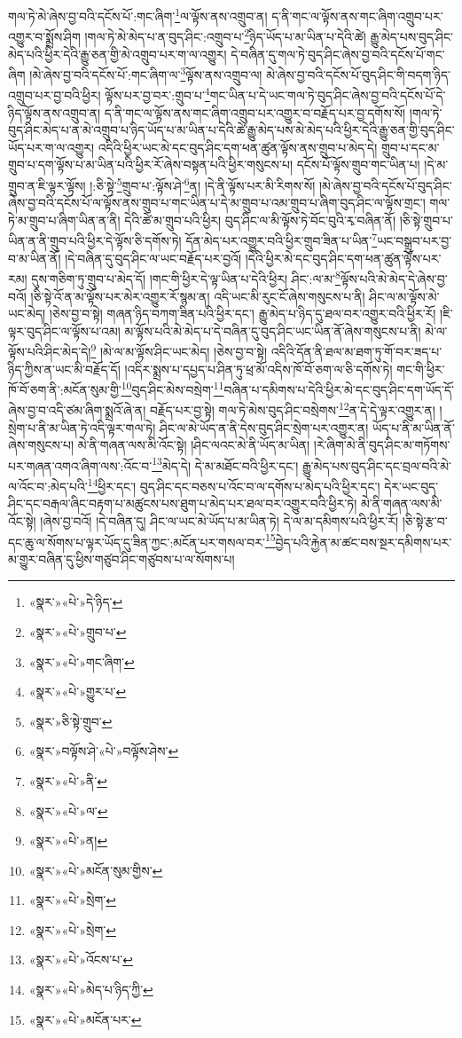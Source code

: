 གལ་ཏེ་མེ་ཞེས་བྱ་བའི་དངོས་པོ་:གང་ཞིག་\footnote{«སྣར་»«པེ་»དེ་ཉིད་}ལ་ལྟོས་ནས་འགྲུབ་ན། ད་ནི་གང་ལ་ལྟོས་ནས་གང་ཞིག་འགྲུབ་པར་འགྱུར་བ་སྨྲོས་ཤིག །གལ་ཏེ་མེ་མེད་པ་ན་བུད་ཤིང་:འགྲུབ་པ་\footnote{«སྣར་»«པེ་»གྲུབ་པ་}ཉིད་ཡོད་པ་མ་ཡིན་པ་དེའི་ཚེ། རྒྱུ་མེད་པས་བུད་ཤིང་མེད་པའི་ཕྱིར་དེའི་རྒྱུ་ཅན་གྱི་མེ་འགྲུབ་པར་ག་ལ་འགྱུར། དེ་བཞིན་དུ་གལ་ཏེ་བུད་ཤིང་ཞེས་བྱ་བའི་དངོས་པོ་གང་ཞིག །མེ་ཞེས་བྱ་བའི་དངོས་པོ་:གང་ཞིག་ལ་\footnote{«སྣར་»«པེ་»གང་ཞིག་}ལྟོས་ནས་འགྲུབ་ལ། མེ་ཞེས་བྱ་བའི་དངོས་པོ་བུད་ཤིང་གི་བདག་ཉིད་འགྲུབ་པར་བྱ་བའི་ཕྱིར། ལྟོས་པར་བྱ་བར་:གྲུབ་པ་\footnote{«སྣར་»«པེ་»གྱུར་པ་}གང་ཡིན་པ་དེ་ཡང་གལ་ཏེ་བུད་ཤིང་ཞེས་བྱ་བའི་དངོས་པོ་དེ་ཉིད་ལྟོས་ནས་འགྲུབ་ན། ད་ནི་གང་ལ་ལྟོས་ནས་གང་ཞིག་འགྲུབ་པར་འགྱུར་བ་བརྗོད་པར་བྱ་དགོས་སོ། །གལ་ཏེ་བུད་ཤིང་མེད་པ་ན་མེ་འགྲུབ་པ་ཉིད་ཡོད་པ་མ་ཡིན་པ་དེའི་ཚེ་རྒྱུ་མེད་པས་མེ་མེད་པའི་ཕྱིར་དེའི་རྒྱུ་ཅན་གྱི་བུད་ཤིང་ཡོད་པར་ག་ལ་འགྱུར། འདིའི་ཕྱིར་ཡང་མེ་དང་བུད་ཤིང་དག་ཕན་ཚུན་ལྟོས་ནས་གྲུབ་པ་མེད་དེ། གྲུབ་པ་དང་མ་གྲུབ་པ་དག་ལྟོས་པ་མ་ཡིན་པའི་ཕྱིར་རོ་ཞེས་བསྟན་པའི་ཕྱིར་གསུངས་པ། དངོས་པོ་ལྟོས་གྲུབ་གང་ཡིན་པ། །དེ་མ་གྲུབ་ན་ཇི་ལྟར་ལྟོས། །:ཅི་སྟེ་\footnote{«སྣར་»ཅི་སྟེ་གྲུབ་}གྲུབ་པ་:ལྟོས་ཤེ་\footnote{«སྣར་»བལྟོས་ཤེ་«པེ་»བལྟོས་ཤེས་}ན། །དེ་ནི་ལྟོས་པར་མི་རིགས་སོ། །མེ་ཞེས་བྱ་བའི་དངོས་པོ་བུད་ཤིང་ཞེས་བྱ་བའི་དངོས་པོ་ལ་ལྟོས་ནས་གྲུབ་པ་གང་ཡིན་པ་དེ་མ་གྲུབ་པ་འམ་གྲུབ་པ་ཞིག་བུད་ཤིང་ལ་ལྟོས་གྲང་། གལ་ཏེ་མ་གྲུབ་པ་ཞིག་ཡིན་ན་ནི། དེའི་ཚེ་མ་གྲུབ་པའི་ཕྱིར། བུད་ཤིང་ལ་མི་ལྟོས་ཏེ་བོང་བུའི་རྭ་བཞིན་ནོ། །ཅི་སྟེ་གྲུབ་པ་ཡིན་ན་ནི་གྲུབ་པའི་ཕྱིར་དེ་ལྟོས་ཅི་དགོས་ཏེ། དོན་མེད་པར་འགྱུར་བའི་ཕྱིར་གྲུབ་ཟིན་པ་ཡིན་\footnote{«སྣར་»«པེ་»ནི་}ཡང་བསྒྲུབ་པར་བྱ་བ་མ་ཡིན་ནོ། །དེ་བཞིན་དུ་བུད་ཤིང་ལ་ཡང་བརྗོད་པར་བྱའོ། །དེའི་ཕྱིར་མེ་དང་བུད་ཤིང་དག་ཕན་ཚུན་ལྟོས་པར་རམ། དུས་གཅིག་ཏུ་གྲུབ་པ་མེད་དོ། །གང་གི་ཕྱིར་དེ་ལྟ་ཡིན་པ་དེའི་ཕྱིར། ཤིང་:ལ་མ་\footnote{«སྣར་»«པེ་»ལ་}ལྟོས་པའི་མེ་མེད་དེ་ཞེས་བྱ་བའོ། །ཅི་སྟེ་འོ་ན་མ་ལྟོས་པར་མེར་འགྱུར་རོ་སྙམ་ན། འདི་ཡང་མི་རུང་ངོ་ཞེས་གསུངས་པ་ནི། ཤིང་ལ་མ་ལྟོས་མེ་ཡང་མེད། །ཅེས་བྱ་བ་སྟེ། གཞན་ཉིད་བཀག་ཟིན་པའི་ཕྱིར་དང་། རྒྱུ་མེད་པ་ཉིད་དུ་ཐལ་བར་འགྱུར་བའི་ཕྱིར་རོ། །ཇི་ལྟར་བུད་ཤིང་ལ་ལྟོས་པ་འམ། མ་ལྟོས་པའི་མེ་མེད་པ་དེ་བཞིན་དུ་བུད་ཤིང་ཡང་ཡིན་ནོ་ཞེས་གསུངས་པ་ནི། མེ་ལ་ལྟོས་པའི་ཤིང་མེད་དེ།\footnote{«སྣར་»«པེ་»ན།} །མེ་ལ་མ་ལྟོས་ཤིང་ཡང་མེད། །ཅེས་བྱ་བ་སྟེ། འདིའི་དོན་ནི་ཐལ་མ་ཐག་ཏུ་གོ་བར་ཟད་པ་ཉིད་ཀྱིས་ན་ཡང་མི་བརྗོད་དོ། །འདིར་སྨྲས་པ་དཔྱད་པ་ཤིན་ཏུ་ཕྲ་མོ་འདིས་ཁོ་བོ་ཅག་ལ་ཅི་དགོས་ཏེ། གང་གི་ཕྱིར་ཁོ་བོ་ཅག་ནི་:མངོན་སུམ་གྱི་\footnote{«སྣར་»«པེ་»མངོན་སུམ་གྱིས་}བུད་ཤིང་མེས་བསྲེག་\footnote{«སྣར་»«པེ་»སྲེག་}བཞིན་པ་དམིགས་པ་དེའི་ཕྱིར་མེ་དང་བུད་ཤིང་དག་ཡོད་དོ་ཞེས་བྱ་བ་འདི་ཙམ་ཞིག་སྨྲའོ་ཞེ་ན། བརྗོད་པར་བྱ་སྟེ། གལ་ཏེ་མེས་བུད་ཤིང་བསྲེགས་\footnote{«སྣར་»«པེ་»སྲེག་}ན་དེ་དེ་ལྟར་འགྱུར་ན། །སྲེག་པ་ནི་མ་ཡིན་ཏེ་འདི་ལྟར་གལ་ཏེ། ཤིང་ལ་མེ་ཡོད་ན་ནི་དེས་བུད་ཤིང་སྲེག་པར་འགྱུར་ན། ཡོད་པ་ནི་མ་ཡིན་ནོ་ཞེས་གསུངས་པ། མེ་ནི་གཞན་ལས་མི་འོང་སྟེ། །ཤིང་ལའང་མེ་ནི་ཡོད་མ་ཡིན། །རེ་ཞིག་མེ་ནི་བུད་ཤིང་མ་གཏོགས་པར་གཞན་འགའ་ཞིག་ལས་:འོང་བ་\footnote{«སྣར་»«པེ་»འོངས་པ་}མེད་དེ། དེ་མ་མཐོང་བའི་ཕྱིར་དང་། རྒྱུ་མེད་པས་བུད་ཤིང་དང་བྲལ་བའི་མེ་ལ་འོང་བ་:མེད་པའི་\footnote{«སྣར་»«པེ་»མེད་པ་ཉིད་ཀྱི་}ཕྱིར་དང་། བུད་ཤིང་དང་བཅས་པ་འོང་བ་ལ་དགོས་པ་མེད་པའི་ཕྱིར་དང་། དེར་ཡང་བུད་ཤིང་དང་བརྒལ་ཞིང་བརྟག་པ་མཚུངས་པས་ཐུག་པ་མེད་པར་ཐལ་བར་འགྱུར་བའི་ཕྱིར་ཏེ། མེ་ནི་གཞན་ལས་མི་འོང་སྟེ། །ཞེས་བྱ་བའོ། །དེ་བཞིན་དུ། ཤིང་ལ་ཡང་མེ་ཡོད་པ་མ་ཡིན་ཏེ། དེ་ལ་མ་དམིགས་པའི་ཕྱིར་རོ། །ཅི་སྟེ་རྩ་བ་དང་ཆུ་ལ་སོགས་པ་ལྟར་ཡོད་དུ་ཟིན་ཀྱང་:མངོན་པར་གསལ་བར་\footnote{«སྣར་»«པེ་»མངོན་པར་}བྱེད་པའི་རྐྱེན་མ་ཚང་བས་སྔར་དམིགས་པར་མ་གྱུར་བཞིན་དུ་ཕྱིས་གཙུབ་ཤིང་གཙུབས་པ་ལ་སོགས་པ། 